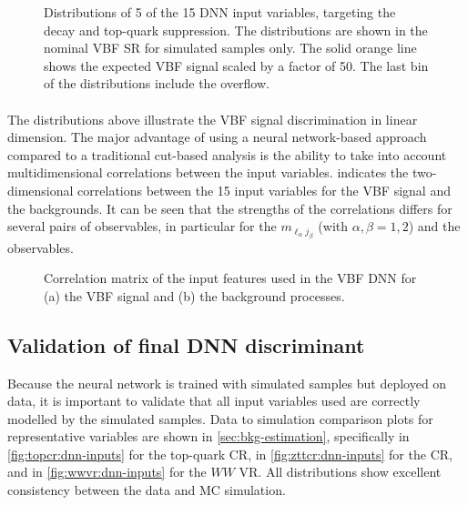 \begin{figure}[ht]
{    }
    {\caption{
            Distributions of 5 of the 15 DNN input variables, targeting the \HWW decay and top-quark suppression. The distributions are shown in the nominal VBF SR for simulated samples only. The solid orange line shows the expected VBF signal scaled by a factor of 50. The last bin of the distributions include the overflow.
            \label{fig:dnn-inputs-post-fit2} }}
\end{figure}
\captionsetup[subfloat]{captionskip=7pt} %

\paragraph{}
\noindent The distributions above illustrate the VBF signal discrimination in linear dimension. The major advantage of using a neural network-based approach compared to a traditional cut-based analysis is the ability to take into account multidimensional correlations between the input variables.  indicates the two-dimensional correlations between the 15 input variables for the VBF signal and the backgrounds. It can be seen that the strengths of the correlations differs for several pairs of observables, in particular for the $m_{\ell_\alpha j_\beta}$ (with $\alpha, \beta = 1, 2$) and the \pTjthree observables.
\begin{figure}[ht]
    \caption{Correlation matrix of the input features used in the VBF DNN for (a) the VBF signal and (b) the background processes.}
    \label{fig:dnn-features-correlations}
\end{figure}

\subsection{Validation of final DNN discriminant}
\label{subsec:fina-model-validation}
Because the neural network is trained with simulated samples but deployed on data, it is important to validate that all input variables used are correctly modelled by the simulated samples.
Data to simulation comparison plots for representative variables are shown in \cref{sec:bkg-estimation}, specifically in \cref{fig:topcr:dnn-inputs} for the top-quark CR, in \cref{fig:zttcr:dnn-inputs} for the \Ztautau CR, and in \cref{fig:wwvr:dnn-inputs} for the $WW$ VR. All distributions show excellent consistency between the data and MC simulation.

